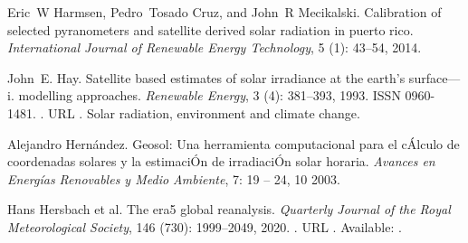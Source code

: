 \documentclass[letterpaper,12pt, twoside]{report}
\providecommand{\DIFdeltex}[1]{{\protect\color{red} \scriptsize #1}} %
\providecommand{\DIFdel}[1]{\texorpdfstring{\DIFdeltex{#1}}{}} %
\begin{document}
\DIFdel{Eric~W Harmsen, Pedro~Tosado Cruz, and John~R Mecikalski.
}%
\DIFdel{Calibration of selected pyranometers and satellite derived solar
  radiation in puerto rico.
}%
\DIFdel{\emph{International Journal of Renewable Energy Technology},
  5}%
\DIFdel{(1):}%
\DIFdel{43--54, 2014.
}%

\DIFdel{John~E. Hay.
}%
\DIFdel{Satellite based estimates of solar irradiance at the earth's
  surface—i. modelling approaches.
}%
\DIFdel{\emph{Renewable Energy}, 3}%
\DIFdel{(4):}%
\DIFdel{381--393, 1993.
}%
\DIFdel{ISSN 0960-1481.
}%
\DIFdel{.
}%
\DIFdel{URL
  }%
\DIFdel{.
}%
\DIFdel{Solar radiation, environment and climate change.
}%

\DIFdel{Alejandro Hernández.
}%
\DIFdel{Geosol: Una herramienta computacional para el cÁlculo de coordenadas
  solares y la estimaciÓn de irradiaciÓn solar horaria.
}%
\DIFdel{\emph{Avances en Energías Renovables y Medio Ambiente}, 7:}%
\DIFdel{19 -- 24, 10 2003.
}%

\DIFdel{Hans }%
\DIFdel{Hersbach et al.}%
\DIFdel{The era5 global reanalysis.
}%
\DIFdel{\emph{Quarterly Journal of the Royal Meteorological Society},
  146}%
\DIFdel{(730):}%
\DIFdel{1999--2049, 2020.
}%
\DIFdel{.
}%
\DIFdel{URL
  }%
\DIFdel{.
}%
\DIFdel{Available: }%
\DIFdel{.
}%
\end{document}
